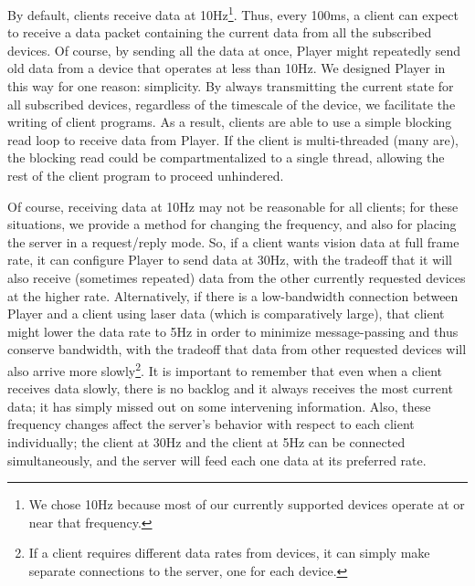 By default, clients receive data at 10Hz\footnote{We chose 10Hz 
because most of our currently supported devices operate at or near that 
frequency.}.
Thus, every 100ms, a client can expect to receive a data packet containing
the current data from all the subscribed devices.  
Of course, by sending all the data at once, Player might repeatedly send old 
data from a device that operates at less than 10Hz.  
We designed Player in
this way for one reason: simplicity.  By always transmitting the current
state for all subscribed devices, regardless of the timescale of the
device, we facilitate the writing of client programs.  As a result,
clients are able to use a simple blocking read loop to receive data 
from Player.  If the client is multi-threaded (many are),
the blocking read could be compartmentalized to a single thread, 
allowing the rest of the client program to proceed unhindered.

Of course, receiving data at 10Hz may not be reasonable for all
clients; for these situations, we provide a method for changing the
frequency, and also for placing the server in a request/reply mode.
So, if a client wants vision data at full frame rate, it can configure
Player to send data at 30Hz, with the tradeoff that it will also
receive (sometimes repeated) data from the other currently requested 
devices at the higher
rate.  Alternatively, if there is a low-bandwidth connection between
Player and a client using laser data (which is comparatively large),
that client might lower the data rate to 5Hz in order to minimize
message-passing and thus conserve bandwidth, with the tradeoff that
data from other requested devices will also arrive more 
slowly\footnote{If a client requires different data rates from 
devices, it can simply make separate connections 
to the server, one for each device.}.  It is
important to remember that even when a client receives data slowly,
there is no backlog and it always receives the most current data; it
has simply missed out on some intervening information.  Also, these
frequency changes affect the server's behavior with respect to each
client individually; the client at 30Hz and the client at 5Hz can be
connected simultaneously, and the server will feed each one data at
its preferred rate.

